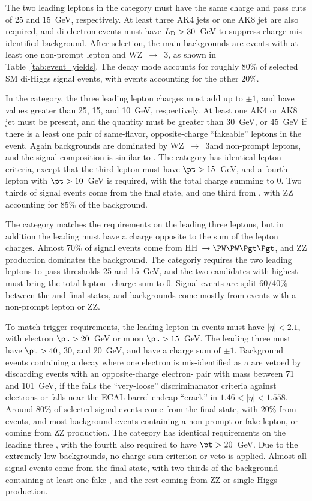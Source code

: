 The two leading leptons in the \llss category must have the same charge and pass
\pt cuts of 25 and 15~GeV, respectively.  At least three AK4 jets or one AK8 jet %
are also required, and di-electron events must have $L_\mathrm{D} > 30$~GeV to suppress
charge mis-identified \Zee background.  After selection, the main \llss
backgrounds are events with at least one non-prompt lepton and WZ~$\to$~3\lep, as shown
in Table~\ref{tab:event_yields}. The \WWWW decay mode accounts for roughly 80\% of
selected SM di-Higgs signal events, with \WWtt events accounting for the other 20\%.

In the \lllnot category, the three leading lepton charges must add up to $\pm1$, and
have \pt values greater than 25, 15, and 10~GeV, respectively.  At least one AK4
or AK8 jet must be present, and the \metLD quantity must be greater than 30~GeV,
or 45~GeV if there is a least one pair of same-flavor, opposite-charge ``fakeable''
leptons in the event.  Again backgrounds are dominated by WZ~$\to$~3\lep and non-prompt
leptons, and the signal composition is similar to \llss.
The \llll category has identical lepton criteria, except that the third lepton
must have $\pt > 15$~GeV, and a fourth lepton with $\pt > 10$~GeV is required, with
the total charge summing to 0.  Two thirds of signal events come from the \WWWW final
state, and one third from \WWtt, with ZZ accounting for 85\% of the background.

The \lllt category matches the \lllnot requirements on the leading three
leptons, but in addition the leading \tauh must have a charge opposite to the sum
of the lepton charges.  Almost 70\% of signal events come from HH~$\to \WWtt$,
and ZZ production dominates the background.  The \lltt categoriy requires
the two leading leptons to pass \pt thresholds 25 and 15~GeV, and the two \tauh
candidates with highest \pt must bring the total lepton+\tauh charge sum to 0.
Signal events are split 60/40\% between the \WWtt and \tttt final
states, and backgrounds come mostly from events with a non-prompt lepton or ZZ.

To match trigger requirements, the leading lepton in \lttt events must have
$|\eta| < 2.1$, with electron $\pt > 20$~GeV or muon $\pt > 15$~GeV.  The leading
three \tauh must have $\pt > 40$, 30, and 20~GeV, and have a charge sum of $\pm1$.
Background events containing a \Zee decay where one electron is mis-identified
as a \tauh are vetoed by discarding events with an opposite-charge electron-\tauh
pair with mass between 71 and 101~GeV, if the \tauh fails the ``very-loose''
discriminanator criteria against electrons or falls near the ECAL barrel-endcap
``crack'' in $1.46 < |\eta| < 1.558$.  Around 80\% of selected signal events come
from the \tttt final state, with 20\% from \WWtt events, and most
background events containing a non-prompt or fake lepton, or coming from ZZ production.
The \noltttt category has identical \pt requirements on the leading three \tauh,
with the fourth \tauh also required to have $\pt > 20$~GeV.  Due to the extremely
low backgrounds, no charge sum criterion or \Zee veto is applied.  Almost
all signal events come from the \tttt final state, with two thirds of the
background containing at least one fake \tauh, and the rest coming from ZZ or single
Higgs production.

